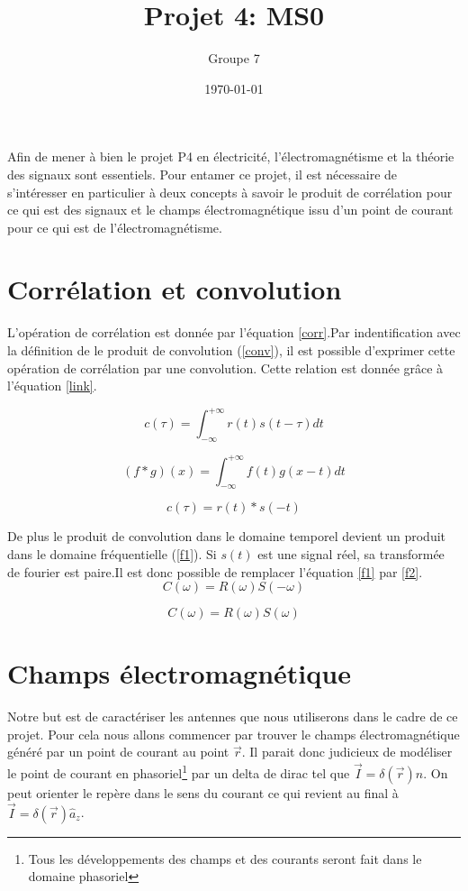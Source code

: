 \documentclass[10pt,a4paper]{article}
\begin{document}
\title{Projet 4: MS0}
\date\today
\author{Groupe 7}
\maketitle

Afin de mener à bien le projet P4 en électricité, l'électromagnétisme et la théorie des signaux sont essentiels. Pour entamer ce projet, il est nécessaire de s'intéresser en particulier à deux concepts à savoir le produit de corrélation pour ce qui est des signaux et le champs électromagnétique issu d'un point de courant pour ce qui est de l'électromagnétisme.

\section{Corrélation et convolution}
	L'opération de corrélation est donnée par l'équation \ref{corr}.Par indentification avec la définition de le produit de convolution (\ref{conv}), il est possible d'exprimer cette opération de corrélation par une convolution. Cette relation est donnée grâce à l'équation \ref{link}.

	\begin{equation}
		c(\tau) = \int _{-\infty}^{+\infty} r(t)s(t-\tau) dt
        \label{corr}
	\end{equation}

	\begin{equation}
		(f*g)(x) = \int _{-\infty}^{+\infty} f(t)g(x-t)dt
        \label{conv}
	\end{equation}
	
	\begin{equation}
		c(\tau) = r(t)*s(-t)
        \label{link}
	\end{equation}
	
	De plus le produit de convolution dans le domaine temporel devient un produit dans le domaine fréquentielle (\ref{f1}). Si $s(t)$ est une signal réel, sa transformée de fourier est paire.Il est donc possible de remplacer l'équation \ref{f1} par \ref{f2}.
	\begin{equation}
		C(\omega) = R(\omega)S(-\omega)
        \label{f1}
	\end{equation}
    
    \begin{equation}
		C(\omega) = R(\omega)S(\omega)
        \label{f2}
	\end{equation}
    
    
\section{Champs électromagnétique}
Notre but est de caractériser les antennes que nous utiliserons dans le cadre de ce projet. Pour cela nous allons commencer par trouver le champs électromagnétique généré par un point de courant au point $\overrightarrow{r}$. Il parait donc judicieux de modéliser le point de courant en phasoriel\footnote{Tous les développements des champs et des courants seront fait dans le domaine phasoriel} par un delta de dirac tel que $\overrightarrow{I}=\delta (\overrightarrow{r})\widehat{n}$. On peut orienter le repère dans le sens du courant ce qui revient au final à $\overrightarrow{I}=\delta (\overrightarrow{r})\widehat{a}_z$.
\end{document}
